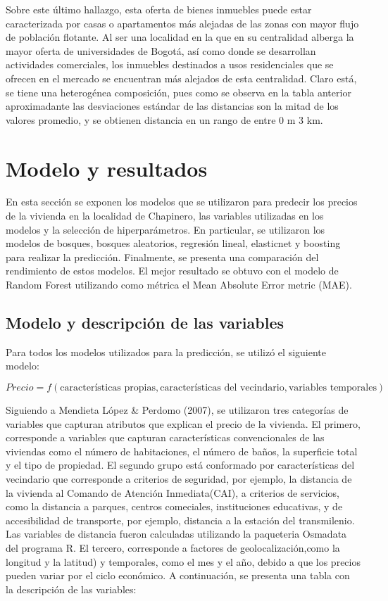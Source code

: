 \documentclass[
  11pt,
  letterpaper,
]{article}
\begin{document}
Sobre este último hallazgo, esta oferta de bienes inmuebles puede estar caracterizada por casas o apartamentos más alejadas de las zonas con mayor flujo de población flotante. Al ser una localidad en la que en su centralidad alberga la mayor oferta de universidades de Bogotá, así como donde se desarrollan actividades comerciales, los inmuebles destinados a usos residenciales que se ofrecen en el mercado se encuentran más alejados de esta centralidad. Claro está, se tiene una heterogénea composición, pues como se observa en la tabla anterior aproximadante las desviaciones estándar de las distancias son la mitad de los valores promedio, y se obtienen distancia en un rango de entre 0 m 3 km.

\hypertarget{modelo-y-resultados}{%
\section{Modelo y resultados}\label{modelo-y-resultados}}

En esta sección se exponen los modelos que se utilizaron para predecir los precios de la vivienda en la localidad de Chapinero, las variables utilizadas en los modelos y la selección de hiperparámetros. En particular, se utilizaron los modelos de bosques, bosques aleatorios, regresión lineal, elasticnet y boosting para realizar la predicción. Finalmente, se presenta una comparación del rendimiento de estos modelos. El mejor resultado se obtuvo con el modelo de Random Forest utilizando como métrica el Mean Absolute Error metric (MAE).

\hypertarget{modelo-y-descripciuxf3n-de-las-variables}{%
\subsection{Modelo y descripción de las variables}\label{modelo-y-descripciuxf3n-de-las-variables}}

Para todos los modelos utilizados para la predicción, se utilizó el siguiente modelo:

\[
Precio= f(\text{características propias}, \text{características del vecindario},\text{variables temporales})
\]

Siguiendo a Mendieta López \& Perdomo (2007), se utilizaron tres categorías de variables que capturan atributos que explican el precio de la vivienda. El primero, corresponde a variables que capturan características convencionales de las viviendas como el número de habitaciones, el número de baños, la superficie total y el tipo de propiedad. El segundo grupo está conformado por características del vecindario que corresponde a criterios de seguridad, por ejemplo, la distancia de la vivienda al Comando de Atención Inmediata(CAI), a criterios de servicios, como la distancia a parques, centros comeciales, instituciones educativas, y de accesibilidad de transporte, por ejemplo, distancia a la estación del transmilenio. Las variables de distancia fueron calculadas utilizando la paqueteria Osmadata del programa R. El tercero, corresponde a factores de geolocalización,como la longitud y la latitud) y temporales, como el mes y el año, debido a que los precios pueden variar por el ciclo económico. A continuación, se presenta una tabla con la descripción de las variables:
\end{document}
